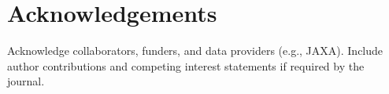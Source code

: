 \section*{Acknowledgements}

Acknowledge collaborators, funders, and data providers (e.g., JAXA). Include author contributions and competing interest statements if required by the journal.
